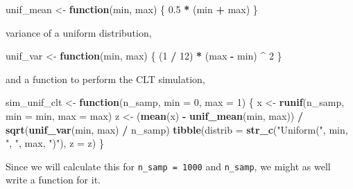 \documentclass[]{book}
\newenvironment{Shaded}{\begin{snugshade}}{\end{snugshade}}
\newcommand{\ControlFlowTok}[1]{\textcolor[rgb]{0.13,0.29,0.53}{\textbf{#1}}}
\newcommand{\DataTypeTok}[1]{\textcolor[rgb]{0.13,0.29,0.53}{#1}}
\newcommand{\DecValTok}[1]{\textcolor[rgb]{0.00,0.00,0.81}{#1}}
\newcommand{\FloatTok}[1]{\textcolor[rgb]{0.00,0.00,0.81}{#1}}
\newcommand{\KeywordTok}[1]{\textcolor[rgb]{0.13,0.29,0.53}{\textbf{#1}}}
\newcommand{\NormalTok}[1]{#1}
\newcommand{\OperatorTok}[1]{\textcolor[rgb]{0.81,0.36,0.00}{\textbf{#1}}}
\newcommand{\StringTok}[1]{\textcolor[rgb]{0.31,0.60,0.02}{#1}}
\theoremstyle{definition}
\theoremstyle{definition}
\theoremstyle{definition}
\theoremstyle{remark}
\begin{document}
\begin{Shaded}
\begin{Highlighting}[]
\NormalTok{unif_mean <-}\StringTok{ }\ControlFlowTok{function}\NormalTok{(min, max) \{}
  \FloatTok{0.5} \OperatorTok{*}\StringTok{ }\NormalTok{(min }\OperatorTok{+}\StringTok{ }\NormalTok{max)}
\NormalTok{\}}
\end{Highlighting}
\end{Shaded}

variance of a uniform distribution,

\begin{Shaded}
\begin{Highlighting}[]
\NormalTok{unif_var <-}\StringTok{ }\ControlFlowTok{function}\NormalTok{(min, max) \{}
\NormalTok{  (}\DecValTok{1} \OperatorTok{/}\StringTok{ }\DecValTok{12}\NormalTok{) }\OperatorTok{*}\StringTok{ }\NormalTok{(max }\OperatorTok{-}\StringTok{ }\NormalTok{min) }\OperatorTok{^}\StringTok{ }\DecValTok{2}
\NormalTok{\}}
\end{Highlighting}
\end{Shaded}

and a function to perform the CLT simulation,

\begin{Shaded}
\begin{Highlighting}[]
\NormalTok{sim_unif_clt <-}\StringTok{ }\ControlFlowTok{function}\NormalTok{(n_samp, }\DataTypeTok{min =} \DecValTok{0}\NormalTok{, }\DataTypeTok{max =} \DecValTok{1}\NormalTok{) \{}
\NormalTok{  x <-}\StringTok{ }\KeywordTok{runif}\NormalTok{(n_samp, }\DataTypeTok{min =}\NormalTok{ min, }\DataTypeTok{max =}\NormalTok{ max)}
\NormalTok{  z <-}\StringTok{ }\NormalTok{(}\KeywordTok{mean}\NormalTok{(x) }\OperatorTok{-}\StringTok{ }\KeywordTok{unif_mean}\NormalTok{(min, max)) }\OperatorTok{/}
\StringTok{    }\KeywordTok{sqrt}\NormalTok{(}\KeywordTok{unif_var}\NormalTok{(min, max) }\OperatorTok{/}\StringTok{ }\NormalTok{n_samp)}
  \KeywordTok{tibble}\NormalTok{(}\DataTypeTok{distrib =} \KeywordTok{str_c}\NormalTok{(}\StringTok{"Uniform("}\NormalTok{, min, }\StringTok{", "}\NormalTok{, max, }\StringTok{")"}\NormalTok{),}
         \DataTypeTok{z =}\NormalTok{ z)}
\NormalTok{\}}
\end{Highlighting}
\end{Shaded}

Since we will calculate this for \texttt{n\_samp\ =\ 1000} and
\texttt{n\_samp}, we might as well write a function for it.
\end{document}
